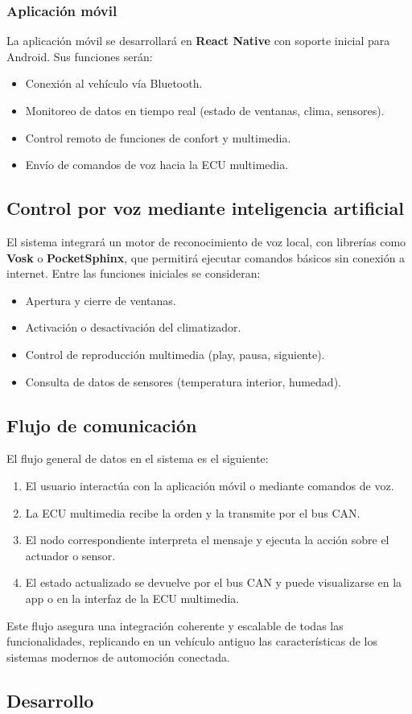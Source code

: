 \subsubsection{Aplicación móvil}
La aplicación móvil se desarrollará en \textbf{React Native} con soporte inicial para Android. Sus funciones serán:
\begin{itemize}
    \item Conexión al vehículo vía Bluetooth.
    \item Monitoreo de datos en tiempo real (estado de ventanas, clima, sensores).
    \item Control remoto de funciones de confort y multimedia.
    \item Envío de comandos de voz hacia la ECU multimedia.
\end{itemize}

\subsection{Control por voz mediante inteligencia artificial}

El sistema integrará un motor de reconocimiento de voz local, con librerías como \textbf{Vosk} o \textbf{PocketSphinx}, que permitirá ejecutar comandos básicos sin conexión a internet. Entre las funciones iniciales se consideran:
\begin{itemize}
    \item Apertura y cierre de ventanas.
    \item Activación o desactivación del climatizador.
    \item Control de reproducción multimedia (play, pausa, siguiente).
    \item Consulta de datos de sensores (temperatura interior, humedad).
\end{itemize}

\subsection{Flujo de comunicación}

El flujo general de datos en el sistema es el siguiente:
\begin{enumerate}
    \item El usuario interactúa con la aplicación móvil o mediante comandos de voz.
    \item La ECU multimedia recibe la orden y la transmite por el bus CAN.
    \item El nodo correspondiente interpreta el mensaje y ejecuta la acción sobre el actuador o sensor.
    \item El estado actualizado se devuelve por el bus CAN y puede visualizarse en la app o en la interfaz de la ECU multimedia.
\end{enumerate}

Este flujo asegura una integración coherente y escalable de todas las funcionalidades, replicando en un vehículo antiguo las características de los sistemas modernos de automoción conectada.

\subsection{Desarrollo}
